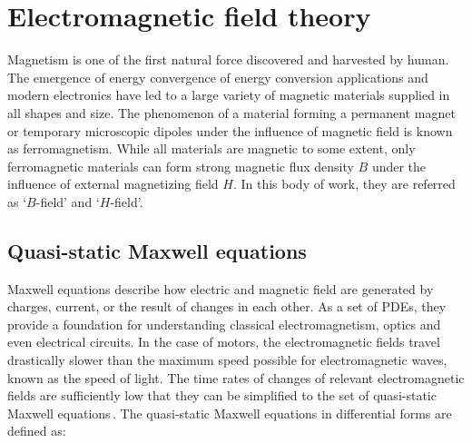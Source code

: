 \section{Electromagnetic field theory}              \label{Chapter:background/electromagnetic field theory}


    Magnetism is one of the first natural force discovered and harvested by human. The emergence of energy convergence of energy conversion applications and modern electronics have led to a large variety of magnetic materials supplied in all shapes and size. The phenomenon of a material forming a permanent magnet or temporary microscopic dipoles under the influence of magnetic field is known as ferromagnetism. While all materials are magnetic to some extent, only ferromagnetic materials can form strong magnetic flux density $B$ under the influence of external magnetizing field $H$. In this body of work, they are referred as ‘$B$-field’ and ‘$H$-field’. 
    

    \subsection{Quasi-static Maxwell equations}     \label{Chapter:background/electromagnetic field theory/quasi-static maxwell equations}
    
    
        Maxwell equations describe how electric and magnetic field are generated by charges, current, or the result of changes in each other. As a set of \acp{PDE}, they provide a foundation for understanding classical electromagnetism, optics and even electrical circuits. In the case of motors, the electromagnetic fields travel drastically slower than the maximum speed possible for electromagnetic waves, known as the speed of light. The time rates of changes of relevant electromagnetic fields are sufficiently low that they can be simplified to the set of quasi-static Maxwell equations\,\cite{Melcher1981ContinuumElectromechanics}. The quasi-static Maxwell equations in differential forms are defined as:
    
